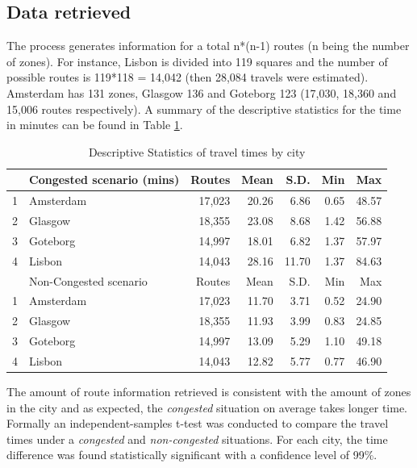 \documentclass[a4paper]{jpconf}
\begin{document}
\subsection{Data retrieved}
The process generates information for a total n*(n-1) routes (n being the number of zones). For instance, Lisbon is divided into 119 squares and the number of possible routes is 119*118 = 14,042 (then 28,084 travels were estimated). Amsterdam has 131 zones, Glasgow 136 and Goteborg 123 (17,030, 18,360 and 15,006 routes respectively). A summary of the descriptive statistics for the time in minutes can be found in Table \ref{tab:Results_routes}.

\begin{table}[ht]		
	\centering
	\begin{tabular}{rlrrrrr}
		\hline
		& Congested scenario (mins) & Routes & Mean & S.D. & Min & Max 	   \\ 
		\hline
		1 & Amsterdam 	& 17,023 & 20.26 & 6.86 	& 0.65 & 48.57 		   \\ 
		2 & Glasgow 	& 18,355 & 23.08 & 8.68 	& 1.42 & 56.88 		   \\ 
		3 & Goteborg 	& 14,997 & 18.01 & 6.82 	& 1.37 & 57.97 	       \\ 
		4 & Lisbon 		& 14,043 & 28.16 & 11.70 	& 1.37 & 84.63 	       \\ 
		
		\hline
		& Non-Congested scenario & Routes & Mean & S.D. & Min & Max    \\ 
		\hline
		1 & Amsterdam	& 17,023 & 11.70 & 3.71 & 0.52 & 24.90 	       \\ 
		2 & Glasgow 	& 18,355 & 11.93 & 3.99 & 0.83 & 24.85 	       \\ 
		3 & Goteborg 	& 14,997 & 13.09 & 5.29 & 1.10 & 49.18 	       \\ 
		4 & Lisbon 		& 14,043 & 12.82 & 5.77 & 0.77 & 46.90         \\ 
		\hline
	\end{tabular}
	\caption {Descriptive Statistics of travel times by city}
	\label{tab:Results_routes}
\end{table}

\indent The amount of route information retrieved is consistent with the amount of zones in the city and as expected, the \textit{congested} situation on average takes longer time. Formally an independent-samples t-test was conducted to compare the travel times under a \textit{congested} and \textit{non-congested} situations. For each city, the time difference was found statistically significant with a confidence level of 99\%.
\end{document}
